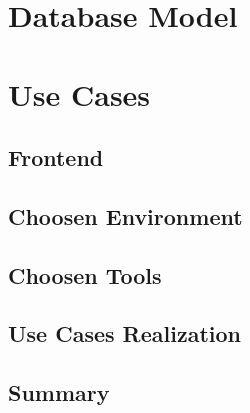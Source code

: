 \section{Database Model}
\section{Use Cases}
  \subsection{Frontend}
  \subsection{Choosen Environment}
  \subsection{Choosen Tools}
  \subsection{Use Cases Realization}
\subsection{Summary}